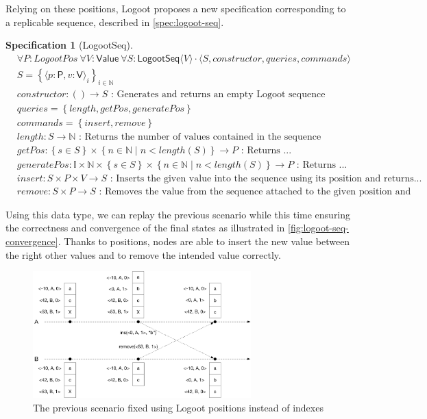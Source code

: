 \documentclass{article}
\newcommand{\commands}[1]{commands = \set{#1}}
\newcommand{\fnspec}[3]{#1: #2 \text{ : #3}}
\newcommand{\inbb}[1]{\in \mathbb{#1}}
\newcommand{\queries}[1]{queries = \set{#1}}
\newcommand{\set}[1]{\left\{#1\right\}} %
\newcommand{\spectuple}[1]{\tuple{#1, constructor, queries, commands}}
\newcommand{\ssep}{\mid} %
\newcommand{\tuple}[1]{\langle #1 \rangle}
\theoremstyle{definition}
\theoremstyle{definition}
\theoremstyle{definition}
\newcounter{specificationcounter}
\theoremstyle{definition}
\newtheorem{specification}[specificationcounter]{Specification}
\begin{document}
Relying on these positions, Logoot proposes a new specification corresponding to a replicable sequence, described in \autoref{spec:logoot-seq}.

\begin{specification}[LogootSeq]
    \begin{align*}
    &\forall P: LogootPos \ \forall V: \mathsf{Value} \ \forall S: \mathsf{LogootSeq} \tuple{V} \cdot \spectuple{S}\\
    &S = \set{\tuple{p: \mathsf{P}, v: \mathsf{V}}_i}_{i \inbb{N}}\\
    &\fnspec{constructor}{\left( \right) \to S}{Generates and returns an empty Logoot sequence}\\
    &\queries{length, getPos, generatePos}\\
    &\commands{insert, remove}\\
    &\fnspec{length}{S \to \mathbb{N}}{Returns the number of values contained in the sequence}\\
    &\fnspec{getPos}{\set{s \in S} \times \set{n \inbb{N} \ssep n < length(S)} \to P}{Returns ...}\\
    &\fnspec{generatePos}{\mathbb{I} \times \mathbb{N} \times \set{s \in S} \times \set{n \inbb{N} \ssep n < length(S)} \to P}{Returns ...}\\
    &\fnspec{insert}{S \times P \times V \to S}{Inserts the given value into the sequence using its position and returns...}\\
    &\fnspec{remove}{S \times P \to S}{Removes the value from the sequence attached to the given position and returns...}
    \end{align*}
    \label{spec:logoot-seq}
\end{specification}

Using this data type, we can replay the previous scenario while this time ensuring the correctness and convergence of the final states as illustrated in \autoref{fig:logoot-seq-convergence}. Thanks to positions, nodes are able to insert the new value between the right other values and to remove the intended value correctly.

\begin{figure}
    \centering
        \includegraphics[width=0.75\textwidth]{img/pos-based-seq.pdf}
    \caption{The previous scenario fixed using Logoot positions instead of indexes}
    \label{fig:logoot-seq-convergence}
\end{figure}
\end{document}
